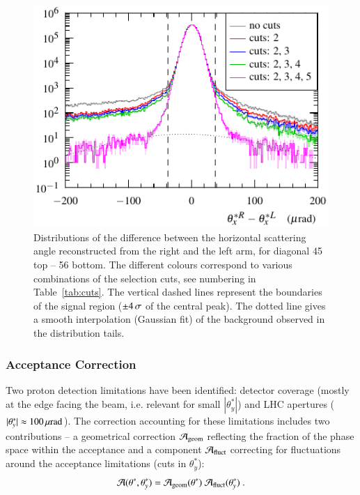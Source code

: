 \begin{figure}
\begin{center}
\includegraphics{fig/cut_distributions.pdf}
\caption{%
Distributions of the difference between the horizontal scattering angle reconstructed from the right and the left arm, for diagonal 45 top -- 56 bottom. The different colours correspond to various combinations of the selection cuts, see numbering in Table~\ref{tab:cuts}. The vertical dashed lines represent the boundaries of the signal region ($\pm 4\,{\rm \sigma}$ of the central peak). The dotted line gives a smooth interpolation (Gaussian fit) of the background observed in the distribution tails.
}
\label{fig:background}
\end{center}
\end{figure}


\subsubsection{Acceptance Correction}
\label{sec:acc corr}

Two proton detection limitations have been identified: detector coverage (mostly at the edge facing the beam, i.e. relevant for small $|\theta_y^*|$) and LHC apertures ($|\theta_y^*| \approx 100\,{\rm \mu rad}$). The correction accounting for these limitations includes two contributions -- a geometrical correction ${\cal A}_{\rm geom}$ reflecting the fraction of the phase space within the acceptance and a component ${\cal A}_{\rm fluct}$ correcting for fluctuations around the acceptance limitations (cuts in $\theta_y^*$):
\begin{equation}
{\cal A}(\theta^*, \theta_y^*) = {\cal A}_{\rm geom}(\theta^*)\ {\cal A}_{\rm fluct}(\theta_y^*)\ .
\end{equation}

